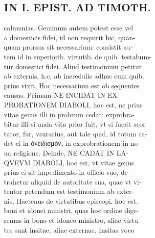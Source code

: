\documentclass{article}
\begin{document}
\begin{pages}
\section*{IN I. EPIST. AD TIMOTH. \\
                }
calumnias. Geminum autem potest esse vel \\
                a domesticis fidei, id non requirit hic, quan- \\
                quam prorsus sit necessarium: consistit au- \\
                tem id in superiorib. virtutib. de quib. testabum- \\
                tur domestici fidei. Aliud testimonium petitur \\
                ab externis, h.e. ab incredulis adhuc cum quib. \\
                prius vixit. Hoc necessarium est ob sequentes \\
                causas. Primum NE INCIDAT IN EX- \\
                PROBATIONEM DIABOLI, hoc est, ne prius \\
                vitae genus illi in probrum cedat: exprobra- \\
                bitur illi si mala vita prior fuit, vt si fuerit scor \\
                tator, fur, vsurarius, aut tale quid, id totum ca- \\
                det ei in ὀνειδισμόν, in exprobrationem in no- \\
                ua religione. Deinde, NE CADAT IN LA- \\
                QVEVM DIABOLI, hoc est, vt vitae genus \\
                prius ei sit impedimento in officio suo, de- \\
                trahetur aliquid de autoritate sua, quae vt vi- \\
                tentur petendum est testimonium ab exter- \\
                nis. Hactenus de virtutibus episcopi, hoc est, \\
                boni et idonei ministri, quas hoc ordine dige- \\
                remus in bono et idoneo ministro, aliae virtu- \\
                tes sunt insitae, aliae externae. Insitas voco \\

\end{pages}
\end{document}
